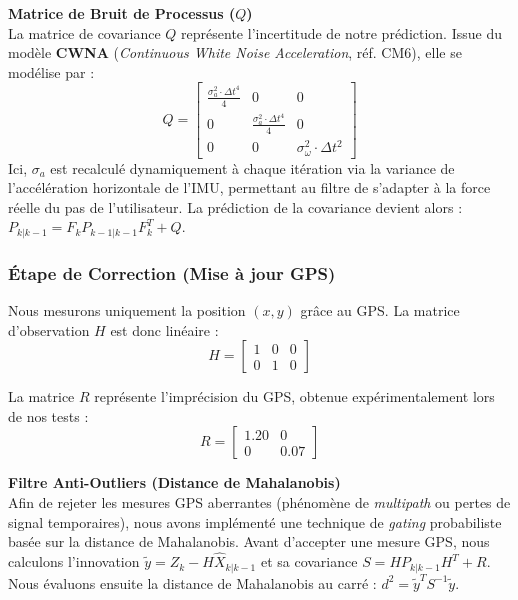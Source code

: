 \textbf{Matrice de Bruit de Processus ($Q$)} \\
La matrice de covariance $Q$ représente l'incertitude de notre prédiction. Issue du modèle \textbf{CWNA} (\textit{Continuous White Noise Acceleration}, réf. CM6), elle se modélise par :
\begin{equation}
 Q = \begin{bmatrix} \frac{\sigma_a^2 \cdot \Delta t^4}{4} & 0 & 0 \\ 0 & \frac{\sigma_a^2 \cdot \Delta t^4}{4} & 0 \\ 0 & 0 & \sigma_\omega^2 \cdot \Delta t^2 \end{bmatrix} 
\end{equation}
Ici, $\sigma_a$ est recalculé dynamiquement à chaque itération via la variance de l'accélération horizontale de l'IMU, permettant au filtre de s'adapter à la force réelle du pas de l'utilisateur.
La prédiction de la covariance devient alors : $P_{k|k-1} = F_k P_{k-1|k-1} F_k^T + Q$.

\subsubsection{Étape de Correction (Mise à jour GPS)}
Nous mesurons uniquement la position $(x, y)$ grâce au GPS. La matrice d'observation $H$ est donc linéaire :
\begin{equation}
 H = \begin{bmatrix} 1 & 0 & 0 \\ 0 & 1 & 0 \end{bmatrix} 
\end{equation}

La matrice $R$ représente l'imprécision du GPS, obtenue expérimentalement lors de nos tests :
\begin{equation}
 R = \begin{bmatrix} 1.20 & 0 \\ 0 & 0.07 \end{bmatrix} 
\end{equation}

\textbf{Filtre Anti-Outliers (Distance de Mahalanobis)} \\
Afin de rejeter les mesures GPS aberrantes (phénomène de \textit{multipath} ou pertes de signal temporaires), nous avons implémenté une technique de \textit{gating} probabiliste basée sur la distance de Mahalanobis. Avant d'accepter une mesure GPS, nous calculons l'innovation $\tilde{y} = Z_k - H \hat{X}_{k|k-1}$ et sa covariance $S = H P_{k|k-1} H^T + R$.
Nous évaluons ensuite la distance de Mahalanobis au carré : $d^2 = \tilde{y}^T S^{-1} \tilde{y}$. 

